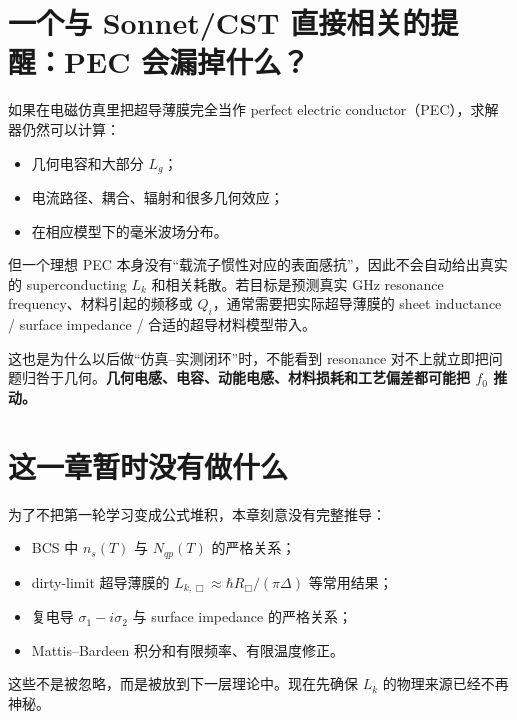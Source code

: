 \documentclass[11pt,a4paper,openany]{ctexrep}
\begin{document}
\section{一个与 Sonnet/CST 直接相关的提醒：PEC 会漏掉什么？}
如果在电磁仿真里把超导薄膜完全当作 perfect electric conductor（PEC），求解器仍然可以计算：
\begin{itemize}
  \item 几何电容和大部分 $L_g$；
  \item 电流路径、耦合、辐射和很多几何效应；
  \item 在相应模型下的毫米波场分布。
\end{itemize}
但一个理想 PEC 本身没有“载流子惯性对应的表面感抗”，因此不会自动给出真实的 superconducting $L_k$ 和相关耗散。若目标是预测真实 GHz resonance frequency、材料引起的频移或 $Q_i$，通常需要把实际超导薄膜的 sheet inductance / surface impedance / 合适的超导材料模型带入。

\begin{center}
\end{center}

这也是为什么以后做“仿真--实测闭环”时，不能看到 resonance 对不上就立即把问题归咎于几何。\textbf{几何电感、电容、动能电感、材料损耗和工艺偏差都可能把 $f_0$ 推动。}

\section{这一章暂时没有做什么}
为了不把第一轮学习变成公式堆积，本章刻意没有完整推导：
\begin{itemize}
  \item BCS 中 $n_s(T)$ 与 $N_{qp}(T)$ 的严格关系；
  \item dirty-limit 超导薄膜的 $L_{k,\Box}\approx\hbar R_\Box/(\pi\Delta)$ 等常用结果；
  \item 复电导 $\sigma_1-i\sigma_2$ 与 surface impedance 的严格关系；
  \item Mattis--Bardeen 积分和有限频率、有限温度修正。
\end{itemize}
这些不是被忽略，而是被放到下一层理论中。现在先确保 $L_k$ 的物理来源已经不再神秘。
\end{document}
